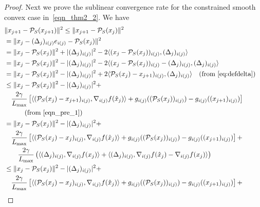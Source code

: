 \documentclass{siamltex}
\begin{document}
\begin{proof}
Next we prove the sublinear convergence rate for the constrained
smooth convex case in~\eqref{eqn_thm2_2}. We have
\begin{alignat}{2}
\nonumber
&\| x_{j+1}- {\mathcal{P}_{S}}(x_{j+1})\|^2 \leq \|x_{j+1} - {\mathcal{P}_{S}}(x_j)\|^2 && \\
\nonumber
& = \|x_j-(\Delta_j)_{i(j)}e_{i(j)} - {\mathcal{P}_{S}}(x_j)\|^2 && \\
\nonumber
& = \|x_j - {\mathcal{P}_{S}}(x_j)\|^2 + |(\Delta_j)_{i(j)}|^2 - 2  \langle (x_j - {\mathcal{P}_{S}}(x_j))_{i(j)}, (\Delta_j)_{i(j)}\rangle && \\
\nonumber
& = \|x_j - {\mathcal{P}_{S}}(x_j)\|^2 - |(\Delta_j)_{i(j)}|^2 - 2  \langle (x_j - {\mathcal{P}_{S}}(x_j))_{i(j)}-(\Delta_j)_{i(j)}, (\Delta_j)_{i(j)}\rangle && \\
\nonumber
& = \|x_j - {\mathcal{P}_{S}}(x_j)\|^2 - |(\Delta_j)_{i(j)}|^2 + 2  \langle {\mathcal{P}_{S}}(x_j)-x_{j+1})_{i(j)}, (\Delta_j)_{i(j)} \rangle 
\quad(\text{from \eqref{eq:defdelta}}) \\
\nonumber
& \leq \|x_j - {\mathcal{P}_{S}}(x_j)\|^2 - |(\Delta_j)_{i(j)}|^2 + && \\
\nonumber 
&\quad  \frac{2\gamma}{L_{\mbox{\rm\scriptsize max}}} \left[\langle ({\mathcal{P}_{S}}(x_j)-x_{j+1})_{i(j)}, \nabla_{i(j)} f({\hat{x}}_{j})\rangle + g_{i(j)}(({\mathcal{P}_{S}}(x_j))_{i(j)}) - g_{i(j)}((x_{j+1})_{i(j)}) \right] 
\\ \nonumber
&\quad \quad
\quad (\text{from \eqref{eqn_pre_1}})
\\
\nonumber
& = \|x_j - {\mathcal{P}_{S}}(x_j)\|^2 - |(\Delta_j)_{i(j)}|^2 + && \\
\nonumber
&\quad \frac{2\gamma}{L_{\mbox{\rm\scriptsize max}}} \left[\langle ({\mathcal{P}_{S}}(x_j)-x_j)_{i(j)}, \nabla_{i(j)} f({\hat{x}}_{j})\rangle + g_{i(j)}(({\mathcal{P}_{S}}(x_j))_{i(j)}) - g_{i(j)}((x_{j+1})_{i(j)})  \right] + && \\
\nonumber
&\quad \quad \frac{2\gamma}{L_{\mbox{\rm\scriptsize max}}}\left(\langle (\Delta_j)_{i(j)}, \nabla_{i(j)} f(x_{j})\rangle +
\langle (\Delta_j)_{i(j)}, \nabla_{i(j)} f({\hat{x}}_{j}) - \nabla_{i(j)} f(x_{j})\rangle \right) && \\
\nonumber
& \leq \|x_j - {\mathcal{P}_{S}}(x_j)\|^2 - |(\Delta_j)_{i(j)}|^2 + && \\
\nonumber
&\quad  \frac{2\gamma}{L_{\mbox{\rm\scriptsize max}}} \left[\langle({\mathcal{P}_{S}}(x_j)-x_j)_{i(j)}, \nabla_{i(j)} f({\hat{x}}_{j})\rangle + g_{i(j)}(({\mathcal{P}_{S}}(x_j))_{i(j)}) - g_{i(j)}((x_{j+1})_{i(j)})  \right] + && \\

\end{alignat}
\end{proof}
\end{document}
